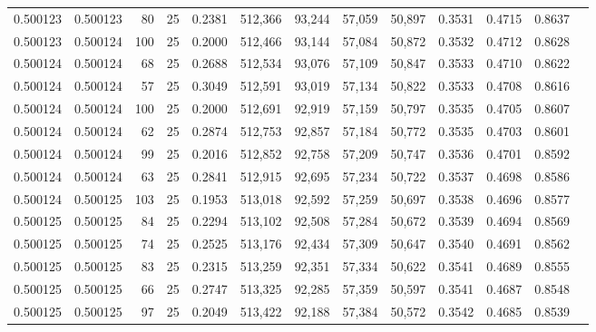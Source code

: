 \begin{tabular}{rrrrrrrrrrrrr}
0.500123 & 0.500123 &    80 &  25 &                                     0.2381 & 512,366 &  93,244 &  57,059 &  50,897 & 0.3531 & 0.4715 & 0.8637 \\
0.500123 & 0.500124 &   100 &  25 &                                     0.2000 & 512,466 &  93,144 &  57,084 &  50,872 & 0.3532 & 0.4712 & 0.8628 \\
0.500124 & 0.500124 &    68 &  25 &                                     0.2688 & 512,534 &  93,076 &  57,109 &  50,847 & 0.3533 & 0.4710 & 0.8622 \\
0.500124 & 0.500124 &    57 &  25 &                                     0.3049 & 512,591 &  93,019 &  57,134 &  50,822 & 0.3533 & 0.4708 & 0.8616 \\
0.500124 & 0.500124 &   100 &  25 &                                     0.2000 & 512,691 &  92,919 &  57,159 &  50,797 & 0.3535 & 0.4705 & 0.8607 \\
0.500124 & 0.500124 &    62 &  25 &                                     0.2874 & 512,753 &  92,857 &  57,184 &  50,772 & 0.3535 & 0.4703 & 0.8601 \\
0.500124 & 0.500124 &    99 &  25 &                                     0.2016 & 512,852 &  92,758 &  57,209 &  50,747 & 0.3536 & 0.4701 & 0.8592 \\
0.500124 & 0.500124 &    63 &  25 &                                     0.2841 & 512,915 &  92,695 &  57,234 &  50,722 & 0.3537 & 0.4698 & 0.8586 \\
0.500124 & 0.500125 &   103 &  25 &                                     0.1953 & 513,018 &  92,592 &  57,259 &  50,697 & 0.3538 & 0.4696 & 0.8577 \\
0.500125 & 0.500125 &    84 &  25 &                                     0.2294 & 513,102 &  92,508 &  57,284 &  50,672 & 0.3539 & 0.4694 & 0.8569 \\
0.500125 & 0.500125 &    74 &  25 &                                     0.2525 & 513,176 &  92,434 &  57,309 &  50,647 & 0.3540 & 0.4691 & 0.8562 \\
0.500125 & 0.500125 &    83 &  25 &                                     0.2315 & 513,259 &  92,351 &  57,334 &  50,622 & 0.3541 & 0.4689 & 0.8555 \\
0.500125 & 0.500125 &    66 &  25 &                                     0.2747 & 513,325 &  92,285 &  57,359 &  50,597 & 0.3541 & 0.4687 & 0.8548 \\
0.500125 & 0.500125 &    97 &  25 &                                     0.2049 & 513,422 &  92,188 &  57,384 &  50,572 & 0.3542 & 0.4685 & 0.8539 \\

\end{tabular}
